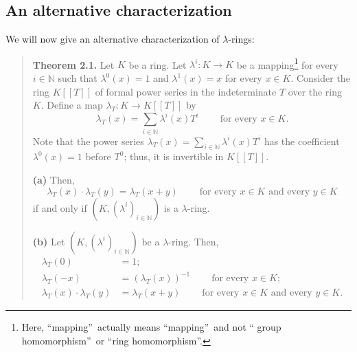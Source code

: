 \documentclass[numbers=enddot,12pt,final,onecolumn,notitlepage]{scrartcl}%
\begin{document}
\subsection{An alternative characterization}

We will now give an alternative characterization of $\lambda$-rings:

\begin{quote}
\textbf{Theorem 2.1.} Let $K$ be a ring. Let $\lambda^{i}:K\rightarrow K$ be a
mapping\footnote{Here, \textquotedblleft mapping\textquotedblright\ actually
means \textquotedblleft mapping\textquotedblright\ and not \textquotedblleft
group homomorphism\textquotedblright\ or \textquotedblleft ring
homomorphism\textquotedblright.} for every $i\in\mathbb{N}$ such that
$\lambda^{0}\left(  x\right)  =1$ and $\lambda^{1}\left(  x\right)  =x$ for
every $x\in K$. Consider the ring $K\left[  \left[  T\right]  \right]  $ of
formal power series in the indeterminate $T$ over the ring $K$. Define a map
$\lambda_{T}:K\rightarrow K\left[  \left[  T\right]  \right]  $ by
\[
\lambda_{T}\left(  x\right)  =\sum\limits_{i\in\mathbb{N}}\lambda^{i}\left(
x\right)  T^{i}\ \ \ \ \ \ \ \ \ \ \text{for every }x\in K.
\]
Note that the power series $\lambda_{T}\left(  x\right)  =\sum\limits_{i\in
\mathbb{N}}\lambda^{i}\left(  x\right)  T^{i}$ has the coefficient
$\lambda^{0}\left(  x\right)  =1$ before $T^{0}$; thus, it is invertible in
$K\left[  \left[  T\right]  \right]  $.

\textbf{(a)} Then,
\[
\lambda_{T}\left(  x\right)  \cdot\lambda_{T}\left(  y\right)  =\lambda
_{T}\left(  x+y\right)  \ \ \ \ \ \ \ \ \ \ \text{for every }x\in K\text{ and
every }y\in K
\]
if and only if $\left(  K,\left(  \lambda^{i}\right)  _{i\in\mathbb{N}%
}\right)  $ is a $\lambda$-ring.

\textbf{(b)} Let $\left(  K,\left(  \lambda^{i}\right)  _{i\in\mathbb{N}%
}\right)  $ be a $\lambda$-ring. Then,%
\begin{align*}
\lambda_{T}\left(  0\right)   &  =1;\\
\lambda_{T}\left(  -x\right)   &  =\left(  \lambda_{T}\left(  x\right)
\right)  ^{-1}\ \ \ \ \ \ \ \ \ \ \text{for every }x\in K;\\
\lambda_{T}\left(  x\right)  \cdot\lambda_{T}\left(  y\right)   &
=\lambda_{T}\left(  x+y\right)  \ \ \ \ \ \ \ \ \ \ \text{for every }x\in
K\text{ and every }y\in K.
\end{align*}



\end{quote}
\end{document}
